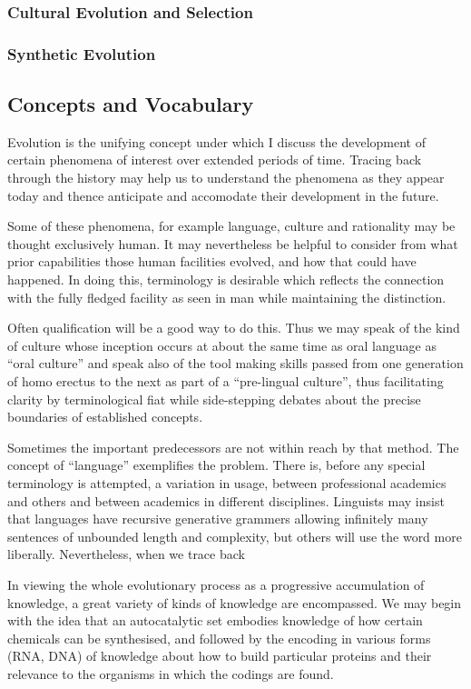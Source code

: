 \documentclass[10pt,titlepage]{book}
\begin{document}
\subsubsection{Cultural Evolution and Selection}

\subsubsection{Synthetic Evolution}
  
\subsection{Concepts and Vocabulary}

Evolution is the unifying concept under which I discuss the development of certain phenomena of interest over extended periods of time.
Tracing back through the history may help us to understand the phenomena as they appear today and thence anticipate and accomodate their development in the future.

Some of these phenomena, for example language, culture and rationality may be thought exclusively human.
It may nevertheless be helpful to consider from what prior capabilities those human facilities evolved, and how that could have happened.
In doing this, terminology is desirable which reflects the connection with the fully fledged facility as seen in man while maintaining the distinction.

Often qualification will be a good way to do this.
Thus we may speak of the kind of culture whose inception occurs at about the same time as oral language as ``oral culture'' and speak also of the tool making skills passed from one generation of homo erectus to the next as part of a ``pre-lingual culture'', thus facilitating clarity by terminological fiat while side-stepping debates about the precise boundaries of established concepts.

Sometimes the important predecessors are not within reach by that method.
The concept of ``language'' exemplifies the problem.
There is, before any special terminology is attempted, a variation in usage, between professional academics and others and between academics in different disciplines.
Linguists may insist that languages have recursive generative grammers allowing infinitely many sentences of unbounded length and complexity, but others will use the word more liberally.
Nevertheless, when we trace back 

In viewing the whole evolutionary process as a progressive accumulation of knowledge, a great variety of kinds of knowledge are encompassed.
We may begin with the idea that an autocatalytic set embodies knowledge of how certain chemicals can be synthesised, and followed by the encoding in various forms (RNA, DNA) of knowledge about how to build particular proteins and their relevance to the organisms in which the codings are found.
\end{document}
